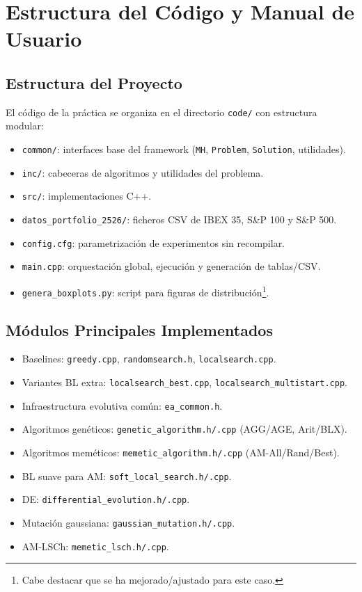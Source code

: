 \newpage
\section{Estructura del Código y Manual de Usuario}
\label{sec:manual}

\subsection{Estructura del Proyecto}

El código de la práctica se organiza en el directorio \texttt{code/} con estructura
modular:

\begin{itemize}[noitemsep]
    \item \texttt{common/}: interfaces base del framework (\texttt{MH}, \texttt{Problem}, \texttt{Solution}, utilidades).
    \item \texttt{inc/}: cabeceras de algoritmos y utilidades del problema.
    \item \texttt{src/}: implementaciones C++.
    \item \texttt{datos\_portfolio\_2526/}: ficheros CSV de IBEX 35, S\&P 100 y S\&P 500.
    \item \texttt{config.cfg}: parametrización de experimentos sin recompilar.
    \item \texttt{main.cpp}: orquestación global, ejecución y generación de tablas/CSV.
    \item \texttt{genera\_boxplots.py}: script para figuras de distribución\footnote{Cabe destacar que se ha mejorado/ajustado para este caso.}.
\end{itemize}

\subsection{Módulos Principales Implementados}

\begin{itemize}[noitemsep]
    \item Baselines: \texttt{greedy.cpp}, \texttt{randomsearch.h}, \texttt{localsearch.cpp}.
    \item Variantes BL extra: \texttt{localsearch\_best.cpp}, \texttt{localsearch\_multistart.cpp}.
    \item Infraestructura evolutiva común: \texttt{ea\_common.h}.
    \item Algoritmos genéticos: \texttt{genetic\_algorithm.h/.cpp} (AGG/AGE, Arit/BLX).
    \item Algoritmos meméticos: \texttt{memetic\_algorithm.h/.cpp} (AM-All/Rand/Best).
    \item BL suave para AM: \texttt{soft\_local\_search.h/.cpp}.
    \item DE: \texttt{differential\_evolution.h/.cpp}.
    \item Mutación gaussiana: \texttt{gaussian\_mutation.h/.cpp}.
    \item AM-LSCh: \texttt{memetic\_lsch.h/.cpp}.
\end{itemize}

